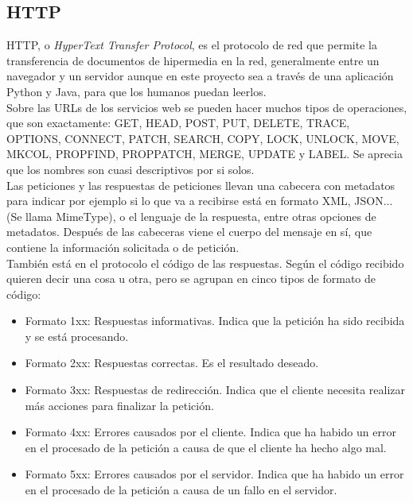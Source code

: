 \documentclass[12pt,spanish,listoffigures,listoftables]{tfgetsinf}
\begin{document}
\subsection{HTTP}
HTTP, o \textit{HyperText Transfer Protocol}, es el protocolo de red que permite la transferencia de documentos de hipermedia en la red, generalmente entre un navegador y un servidor aunque en este proyecto sea a través de una aplicación Python y Java, para que los humanos puedan leerlos. \\

Sobre las URLs de los servicios web se pueden hacer muchos tipos de operaciones, que son exactamente: GET, HEAD, POST, PUT, DELETE, TRACE, OPTIONS, CONNECT, PATCH, SEARCH, COPY, LOCK, UNLOCK, MOVE, MKCOL, PROPFIND, PROPPATCH, MERGE, UPDATE y LABEL. Se aprecia que los nombres son cuasi descriptivos por si solos. \\

Las peticiones y las respuestas de peticiones llevan una cabecera con metadatos para indicar por ejemplo si lo que va a recibirse está en formato XML, JSON... (Se llama MimeType), o el lenguaje de la respuesta, entre otras opciones de metadatos. Después de las cabeceras viene el cuerpo del mensaje en sí, que contiene la información solicitada o de petición. \\

También está en el protocolo el código de las respuestas. Según el código recibido quieren decir una cosa u otra, pero se agrupan en cinco tipos de formato de código:
\begin{itemize}
	\item Formato 1xx: Respuestas informativas. Indica que la petición ha sido recibida y se está procesando.
	\item Formato 2xx: Respuestas correctas. Es el resultado deseado.
	\item Formato 3xx: Respuestas de redirección. Indica que el cliente necesita realizar más acciones para finalizar la petición.
	\item Formato 4xx: Errores causados por el cliente. Indica que ha habido un error en el procesado de la petición a causa de que el cliente ha hecho algo mal.
	\item Formato 5xx: Errores causados por el servidor. Indica que ha habido un error en el procesado de la petición a causa de un fallo en el servidor.
\end{itemize}
\end{document}
